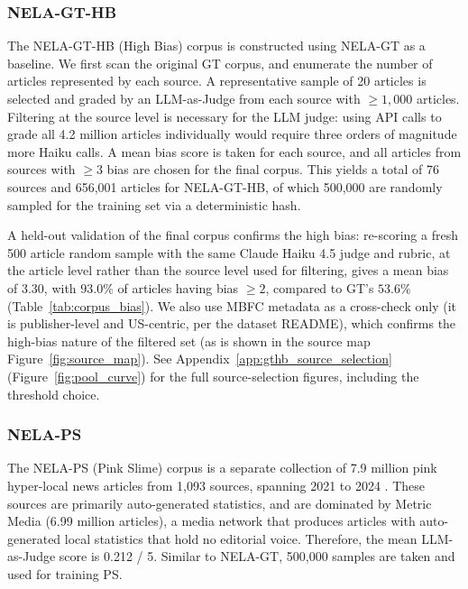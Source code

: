 \documentclass[11pt]{article}
\begin{document}
\subsubsection{NELA-GT-HB}
\label{subsec:gthb}

The NELA-GT-HB (High Bias) corpus is constructed using NELA-GT as a baseline.
We first scan the original GT corpus, and enumerate the number of articles represented by each source.
A representative sample of 20 articles is selected and graded by an LLM-as-Judge from each source with $\ge1{,}000$ articles.
Filtering at the source level is necessary for the LLM judge: using API calls to grade all 4.2 million articles individually would require three orders of magnitude more Haiku calls.
A mean bias score is taken for each source, and all articles from sources with $\ge3$ bias are chosen for the final corpus.
This yields a total of 76 sources and 656{,}001 articles for NELA-GT-HB, of which 500{,}000 are randomly sampled for the training set via a deterministic hash.

A held-out validation of the final corpus confirms the high bias: re-scoring a fresh 500 article random sample with the same Claude Haiku 4.5 judge and rubric, at the article level rather than the source level used for filtering, gives a mean bias of 3.30, with $93.0\%$ of articles having bias $\ge2$, compared to GT's $53.6\%$ (Table~\ref{tab:corpus_bias}).
We also use MBFC metadata as a cross-check only (it is publisher-level and US-centric, per the dataset README), which confirms the high-bias nature of the filtered set (as is shown in the source map Figure~\ref{fig:source_map}).
See Appendix~\ref{app:gthb_source_selection} (Figure~\ref{fig:pool_curve}) for the full source-selection figures, including the threshold choice.

\subsubsection{NELA-PS}

The NELA-PS (Pink Slime) corpus is a separate collection of 7.9 million pink hyper-local news articles from 1{,}093 sources, spanning
2021 to 2024 \cite{horne2024nelaps}. These sources are primarily auto-generated statistics, and are dominated by Metric Media (6.99 million articles), a media 
network that produces articles with auto-generated local statistics that hold no editorial voice. 
Therefore, the mean LLM-as-Judge score is 0.212 / 5.
Similar to NELA-GT, 500{,}000 samples are taken and used for training PS. 
\end{document}

